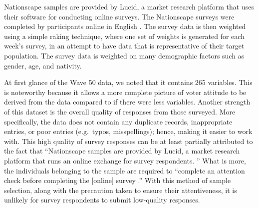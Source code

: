 \documentclass[
]{article}
\begin{document}
Nationscape samples are provided by Lucid, a market research platform that uses their software for conducting online surveys. The Nationscape surveys were completed by participants online in English \cite{tausanovitch_vavreck_reny_hayes_rudkin_2019} . The survey data is then weighted using a simple raking technique, where one set of weights is generated for each week's survey, in an attempt to have data that is representative of their target population. The survey data is weighted on many demographic factors such as gender, age, and nativity.

At first glance of the Wave 50 data, we noted that it contains 265 variables. This is noteworthy because it allows a more complete picture of voter attitude to be derived from the data compared to if there were less variables. Another strength of this dataset is the overall quality of responses from those surveyed. More specifically, the data does not contain any duplicate records, inappropriate entries, or poor entries (e.g.~typos, misspellings); hence, making it easier to work with. This high quality of survey responses can be at least partially attributed to the fact that ``Nationscape samples are provided by Lucid, a market research platform that runs an online exchange for survey respondents. \cite{tausanovitch_vavreck_reny_hayes_rudkin_2019}'' What is more, the individuals belonging to the sample are required to ``complete an attention check before completing the {[}online{]} survey \cite{tausanovitch_vavreck_reny_hayes_rudkin_2019}.'' With this method of sample selection, along with the precaution taken to ensure their attentiveness, it is unlikely for survey respondents to submit low-quality responses.
\end{document}
